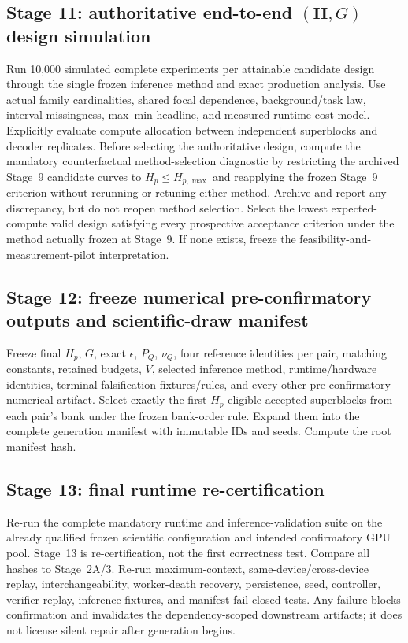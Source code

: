 \documentclass[11pt,a4paper]{article}
\begin{document}
\subsection{Stage 11: authoritative end-to-end $(\mathbf H,G)$ design simulation}
Run 10,000 simulated complete experiments per attainable candidate design through the single frozen inference method and exact production analysis. Use actual family cardinalities, shared focal dependence, background/task law, interval missingness, max--min headline, and measured runtime-cost model. Explicitly evaluate compute allocation between independent superblocks and decoder replicates. Before selecting the authoritative design, compute the mandatory counterfactual method-selection diagnostic by restricting the archived Stage~9 candidate curves to $H_p\le H_{p,\max}$ and reapplying the frozen Stage~9 criterion without rerunning or retuning either method. Archive and report any discrepancy, but do not reopen method selection. Select the lowest expected-compute valid design satisfying every prospective acceptance criterion under the method actually frozen at Stage~9. If none exists, freeze the feasibility-and-measurement-pilot interpretation.

\subsection{Stage 12: freeze numerical pre-confirmatory outputs and scientific-draw manifest}
Freeze final $H_p$, $G$, exact $\epsilon$, $P_Q$, $\nu_Q$, four reference identities per pair, matching constants, retained budgets, $V$, selected inference method, runtime/hardware identities, terminal-falsification fixtures/rules, and every other pre-confirmatory numerical artifact. Select exactly the first $H_p$ eligible accepted superblocks from each pair's bank under the frozen bank-order rule. Expand them into the complete generation manifest with immutable IDs and seeds. Compute the root manifest hash.

\subsection{Stage 13: final runtime re-certification}
Re-run the complete mandatory runtime and inference-validation suite on the already qualified frozen scientific configuration and intended confirmatory GPU pool. Stage~13 is re-certification, not the first correctness test. Compare all hashes to Stage~2A/3. Re-run maximum-context, same-device/cross-device replay, interchangeability, worker-death recovery, persistence, seed, controller, verifier replay, inference fixtures, and manifest fail-closed tests. Any failure blocks confirmation and invalidates the dependency-scoped downstream artifacts; it does not license silent repair after generation begins.
\end{document}
